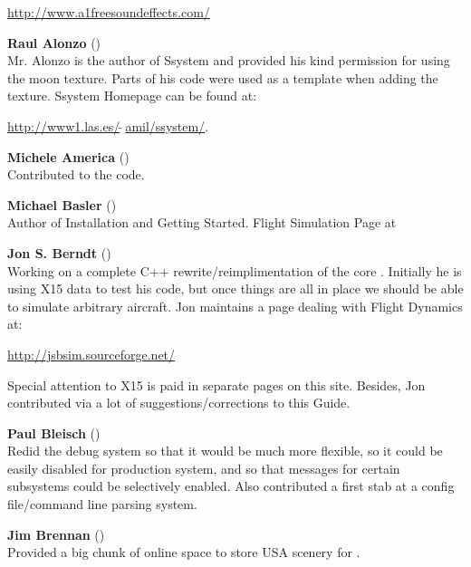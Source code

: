    \href{http://www.a1freesoundeffects.com/}{http://www.a1freesoundeffects.com/}
   \medskip

\noindent \textbf{Raul Alonzo} ()\\
   Mr. Alonzo is the
 author of Ssystem and provided his kind permission for using the moon texture.
 Parts of his code were used as a template when adding the texture.
  Ssystem Homepage can be found at:
   \medskip

  \href{http://www1.las.es/~amil/ssystem/}{http://www1.las.es/$\tilde{~~}$amil/ssystem/}.
 \medskip

 \noindent \textbf{Michele America}
()\\
  Contributed to the  code.
 \medskip

\noindent \textbf{Michael Basler} ()\\
 Author of Installation and Getting Started. Flight Simulation Page at
  \medskip

\medskip

\noindent \textbf{Jon S. Berndt} ()\\
 Working on a complete C++ rewrite/reimplimentation of the core .
  Initially he is using X15 data to test his code, but once things are
  all in place we should be able to simulate arbitrary aircraft. Jon
  maintains a page dealing with Flight Dynamics at:
   \medskip

  \href{http://jsbsim.sourceforge.net/}{http://jsbsim.sourceforge.net/}
   \medskip

\noindent
  Special attention to X15 is paid in separate pages on this site. Besides, Jon
  contributed via a lot of suggestions/corrections to this Guide.
\medskip

\noindent \textbf{Paul Bleisch} ()\\
  Redid the debug system so that it would be much more
  flexible, so it could be easily disabled for production system, and
  so that messages for certain subsystems could be selectively
  enabled. Also contributed a first stab at a config file/command line parsing
  system.
 \medskip


\noindent \textbf{Jim Brennan} ()\\
  Provided a big chunk of online space to store USA scenery for \FlightGear{}$\!$.
 \medskip

